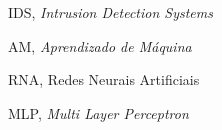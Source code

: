 \begin{siglas}
  \item IDS, \textit{Intrusion Detection Systems}
  \item AM, \textit{Aprendizado de Máquina}
  \item RNA, Redes Neurais Artificiais
  \item MLP, \textit{Multi Layer Perceptron}
\end{siglas}
